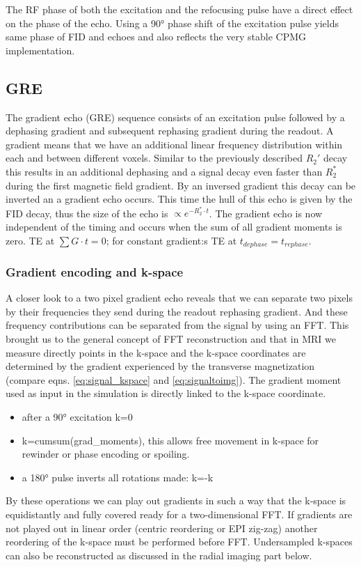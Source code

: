 \documentclass[a4paper,12pt]{extarticle}
\begin{document}
The RF phase of both the excitation and the refocusing pulse have a direct effect on the phase of the echo. Using a 90° phase shift of the excitation pulse yields same phase of FID and echoes and also reflects the very stable CPMG implementation.



\subsection{GRE}
The gradient echo (GRE) sequence consists of an excitation pulse followed by a dephasing gradient and subsequent rephasing gradient during the readout.
A gradient means that we have an additional linear frequency distribution within each and between different voxels. Similar to the previously described $R_2'$ decay this results in an additional dephasing and a signal decay even faster than $R_2^*$ during the first magnetic field gradient. By an inversed gradient this decay can be inverted an a gradient echo occurs.
This time the hull of this echo is given by the FID decay, thus the size of the echo is $\propto e^{-R_2^*\cdot t}$.
The gradient echo is now independent of the timing and occurs when the sum of all gradient moments is zero.
TE at  $\sum G\cdot t=0$; for constant gradient:s TE at $t_{dephase}=t_{rephase}$.

\subsubsection{Gradient encoding and k-space}
A closer look to a two pixel gradient echo reveals that we can separate two pixels by their frequencies they send during the readout rephasing gradient. And these frequency contributions can be separated from the signal by using an FFT.
This brought us to the general concept of FFT reconstruction and that in MRI we measure directly points in the k-space and the k-space coordinates are determined by the gradient experienced by the transverse magnetization (compare eqns. \eqref{eq:signal_kspace} and \eqref{eq:signaltoimg}). The gradient moment used as input in the simulation is directly linked to the k-space coordinate.
\begin{itemize}
\item after a 90° excitation k=0
\item k=cumsum(grad\_moments), this allows free movement in k-space for rewinder or phase encoding or spoiling.
\item a 180° pulse inverts all rotations made: k=-k
\end{itemize}
By these operations we can play out gradients in such a way that the k-space is equidistantly and fully covered ready for a two-dimensional FFT. If gradients are not played out in linear order (centric reordering or EPI zig-zag) another reordering of the k-space must be performed before FFT. Undersampled k-spaces can also be reconstructed as discussed in the radial imaging part below.
\end{document}
